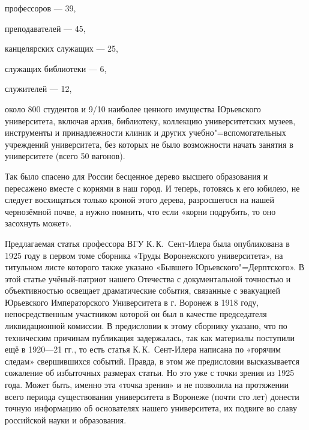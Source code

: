 профессоров — 39,

преподавателей — 45,

канцелярских служащих — 25,

служащих библиотеки — 6,

служителей — 12,

около 800 студентов и 9/10 наиболее ценного имущества Юрьевского университета,
включая архив, библиотеку, коллекцию университетских музеев, инструменты и при\-на\-д\-ле\-ж\-но\-с\-ти клиник и других учебно"=вспомогательных учреждений университета, без которых не было возможности начать занятия в университете (всего 50 вагонов).

Так было спасено для России бесценное дерево высшего образования и пересажено вместе с корнями в наш город. И теперь, готовясь к его юбилею, не следует восхищаться только кроной этого дерева, разросшегося на нашей чернозёмной почве, а нужно помнить, что если «корни подрубить, то оно засохнуть может».

Предлагаемая статья профессора ВГУ К.\,К.~Сент-Илера была опубликована в 1925 году
в первом томе сборника «Труды Воронежского университета»,
на титульном листе которого также указано «Бывшего Юрьевского"=Дер\-п\-т\-с\-ко\-го». В этой статье учёный-патриот нашего Отечества с документальной точностью и объективностью освещает драматические события, связанные с эвакуацией Юрьевского Императорского Университета в г. Воронеж в 1918 году, непосредственным участником которой он был в качестве председателя ликвидационной комиссии. В предисловии к этому сборнику указано, что по техническим причинам публикация задержалась, так как материалы поступили ещё в 1920—21 гг., то есть статья
К.\,К.~Сент-Илера написана по «горячим следам» свершившихся событий.
Правда, в этом же предисловии высказывается сожаление об избыточных размерах статьи.
Но это уже с точки зрения из 1925 года.
Может быть, именно эта «точка зрения» и не позволила на протяжении всего периода существования университета в Воронеже
(почти сто лет) донести точную информацию об основателях нашего университета,
их подвиге во славу российской науки и образования.
